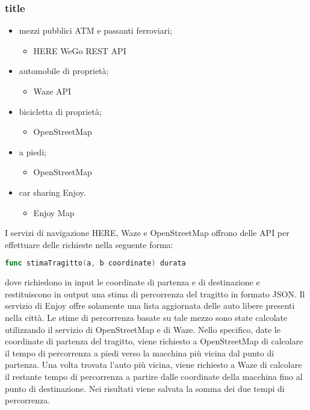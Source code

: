 \subsubsection{title}


\begin{itemize}
	\item mezzi pubblici ATM e passanti ferroviari;
	\begin{itemize}
		\item HERE WeGo REST API\cite{herewegoapi}
	\end{itemize}
	\item automobile di proprietà;
	\begin{itemize}
		\item Waze API\cite{wazeapi}
	\end{itemize}
	\item bicicletta di proprietà;
	\begin{itemize}
		\item OpenStreetMap\cite{openstreetmap}
	\end{itemize}
	\item a piedi;
	\begin{itemize}
		\item OpenStreetMap\cite{openstreetmap}
	\end{itemize}
	\item car sharing Enjoy.
	\begin{itemize}
		\item Enjoy Map\cite{enjoycarsharing}
	\end{itemize}
\end{itemize}

I servizi di navigazione HERE, Waze e OpenStreetMap offrono delle API per effettuare delle richieste nella seguente forma:
\begin{lstlisting}[language=Go]
func stimaTragitto(a, b coordinate) durata
\end{lstlisting}
dove richiedono in input le coordinate di partenza e di destinazione e restituiscono in output una stima di percorrenza del tragitto in formato JSON.
Il servizio di Enjoy offre solamente una lista aggiornata delle auto libere presenti nella città. Le stime di percorrenza basate su tale mezzo sono state calcolate utilizzando il servizio di OpenStreetMap e di Waze. Nello specifico, date le coordinate di partenza del tragitto, viene richiesto a OpenStreetMap di calcolare il tempo di percorrenza a piedi verso la macchina più vicina dal punto di partenza. Una volta trovata l'auto più vicina, viene richiesto a Waze di calcolare il restante tempo di percorrenza a partire dalle coordinate della macchina fino al punto di destinazione. Nei risultati viene salvata la somma dei due tempi di percorrenza.


